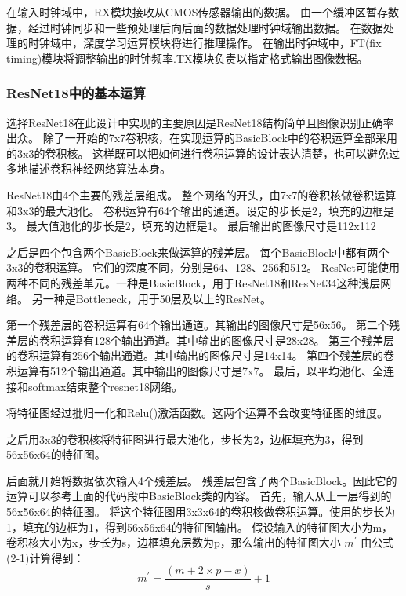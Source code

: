 在输入时钟域中，RX模块接收从CMOS传感器输出的数据。
由一个缓冲区暂存数据，经过时钟同步和一些预处理后向后面的数据处理时钟域输出数据。
在数据处理的时钟域中，深度学习运算模块将进行推理操作。
在输出时钟域中，FT(fix timing)模块将调整输出的时钟频率.TX模块负责以指定格式输出图像数据。  


\subsubsection{ResNet18中的基本运算}
选择ResNet18在此设计中实现的主要原因是ResNet18结构简单且图像识别正确率出众。
除了一开始的7x7卷积核，在实现运算的BasicBlock中的卷积运算全部采用的3x3的卷积核。
这样既可以把如何进行卷积运算的设计表达清楚，也可以避免过多地描述卷积神经网络算法本身。

ResNet18由4个主要的残差层组成。
整个网络的开头，由7x7的卷积核做卷积运算和3x3的最大池化。
卷积运算有64个输出的通道。设定的步长是2，填充的边框是3。
最大值池化的步长是2，填充的边框是1。
最后输出的图像尺寸是112x112

之后是四个包含两个BasicBlock来做运算的残差层。
每个BasicBlock中都有两个3x3的卷积运算。
它们的深度不同，分别是64、128、256和512。
ResNet可能使用两种不同的残差单元。一种是BasicBlock，用于ResNet18和ResNet34这种浅层网络。
另一种是Bottleneck，用于50层及以上的ResNet。

第一个残差层的卷积运算有64个输出通道。其输出的图像尺寸是56x56。
第二个残差层的卷积运算有128个输出通道。其中输出的图像尺寸是28x28。
第三个残差层的卷积运算有256个输出通道。其中输出的图像尺寸是14x14。
第四个残差层的卷积运算有512个输出通道。其中输出的图像尺寸是7x7。
最后，以平均池化、全连接和softmax结束整个resnet18网络。


将特征图经过批归一化和Relu()激活函数。这两个运算不会改变特征图的维度。

之后用3x3的卷积核将特征图进行最大池化，步长为2，边框填充为3，得到56x56x64的特征图。

后面就开始将数据依次输入4个残差层。
残差层包含了两个BasicBlock。因此它的运算可以参考上面的代码段中BasicBlock类的内容。
首先，输入从上一层得到的56x56x64的特征图。
将这个特征图用3x3x64的卷积核做卷积运算。使用的步长为1，填充的边框为1，得到56x56x64的特征图输出。
假设输入的特征图大小为m，卷积核大小为x，步长为s，边框填充层数为p，那么输出的特征图大小 $m^{'}$ 由公式(2-1)计算得到：
\begin{equation}
m^{'} = \frac{( m + 2 \times p - x )}{s} + 1 
\end{equation}  


